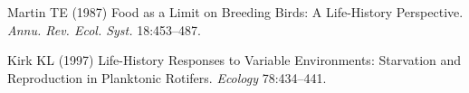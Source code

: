 \documentclass{pnastwo}
\begin{document}
\begin{article}


%
%



%





%
%
%
%
%


%

\begin{thebibliography}{10}

Martin TE
\newblock (1987) {Food as a Limit on Breeding Birds: A Life-History
  Perspective}.
\newblock \emph{Annu. Rev. Ecol. Syst.} 18:453--487.

Kirk KL
\newblock (1997) {Life-History Responses to Variable Environments: Starvation
  and Reproduction in Planktonic Rotifers}.
\newblock \emph{Ecology} 78:434--441.


\end{thebibliography}
\end{article}
\end{document}
